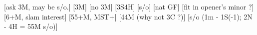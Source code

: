 \begin{bidsemi}
[ask 3M, may be s/o.]
    [3M]
    [no 3M]
    [3S4H]
        [s/o]
        [nat GF]
[fit in opener's minor ?]
[6+M, slam interest]
[55+M, MST+]
[44M  (why not 3C ?)]
[s/o  (1m - 1S(-1); 2N - 4H = 55M s/o)]
\end{bidsemi}